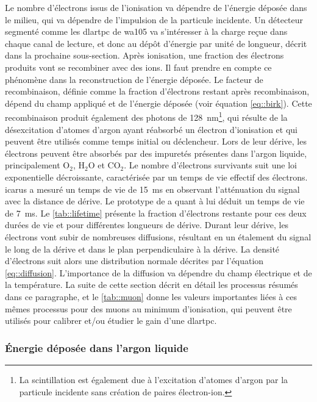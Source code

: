         Le nombre d'électrons issus de l'ionisation va dépendre de l'énergie déposée dans le milieu, qui va dépendre de l'impulsion de la particule incidente. Un détecteur segmenté comme les \gls{dlartpc} de \gls{wa105} va s'intéresser à la charge reçue dans chaque canal de lecture, et donc au dépôt d'énergie par unité de longueur, décrit dans la prochaine sous-section. Après ionisation, une fraction des électrons produits vont se recombiner avec des ions. Il faut prendre en compte ce phénomène dans la reconstruction de l'énergie déposée. Le facteur de recombinaison, définie comme la fraction d'électrons restant après recombinaison, dépend du champ appliqué et de l'énergie déposée (voir équation \eqref{eq::birk}). Cette recombinaison produit également des photons de \SI{128}{\nano\meter}\footnote{La scintillation est également due à l'excitation d'atomes d'argon par la particule incidente sans création de paires électron-ion.}, qui résulte de la désexcitation d'atomes d'argon ayant réabsorbé un électron d'ionisation et qui peuvent être utilisés comme temps initial ou déclencheur. Lors de leur dérive, les électrons peuvent être absorbés par des impuretés présentes dans l'argon liquide, principalement O$_2$, H$_2$O et CO$_2$. Le nombre d'électrons survivants suit une loi exponentielle décroissante, caractérisée par un temps de vie effectif des électrons. \gls{icarus} a mesuré un temps de vie de \SI{15}{\milli\second}\cite{Antonello2014} en observant l'atténuation du signal avec la distance de dérive. Le prototype de \protosp{} a quant à lui déduit un temps de vie de \SI{7}{\milli\second}. Le \autoref{tab::lifetime} présente la fraction d'électrons restante pour ces deux durées de vie et pour différentes longueurs de dérive. Durant leur dérive, les électrons vont subir de nombreuses diffusions, résultant en un étalement du signal le long de la dérive et dans le plan perpendiculaire à la dérive. La densité d'électrons suit alors une distribution normale décrites par l'équation \eqref{eq::diffusion}. L'importance de la diffusion va dépendre du champ électrique et de la température. La suite de cette section décrit en détail les processus résumés dans ce paragraphe, et le \autoref{tab::muon} donne les valeurs importantes liées à ces mêmes processus pour des muons au minimum d'ionisation, qui peuvent être utilisés pour calibrer et/ou étudier le gain d'une \gls{dlartpc}. 

      \subsubsection{Énergie déposée dans l'argon liquide}


